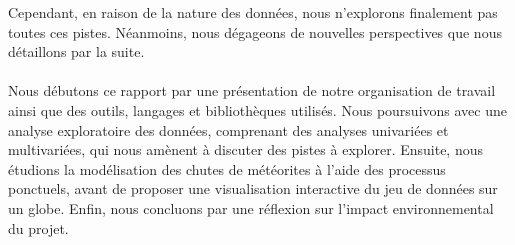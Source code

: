 \documentclass[12pt]{article}
\begin{document}
Cependant, en raison de la nature des données, nous n'explorons finalement pas toutes ces pistes. Néanmoins, nous dégageons de nouvelles perspectives que nous détaillons par la suite.\\
\\
Nous débutons ce rapport par une présentation de notre organisation de travail ainsi que des outils, langages et bibliothèques utilisés. Nous poursuivons avec une analyse exploratoire des données, comprenant des analyses univariées et multivariées, qui nous amènent à discuter des pistes à explorer. Ensuite, nous étudions la modélisation des chutes de météorites à l'aide des processus ponctuels, avant de proposer une visualisation interactive du jeu de données sur un globe. Enfin, nous concluons par une réflexion sur l'impact environnemental du projet.\\
\newpage
\end{document}
